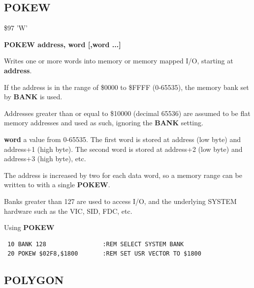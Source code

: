 \subsection{POKEW}
\begin{description}[leftmargin=2cm,style=nextline]
\item [Token:] \$97 'W'
\item [Format:] {\bf POKEW address, word [,word ...] }
\item [Usage:]  Writes one or more words into memory
                or memory mapped I/O, starting at
                {\bf address}.

                If the address is in the range of \$0000 to \$FFFF (0-65535), the
                memory bank set by {\bf BANK} is used.

                Addresses greater than or equal to \$10000 (decimal 65536) are assumed to be flat memory
                addresses and used as such, ignoring the {\bf BANK} setting.

                {\bf word} a value from 0-65535.
                The first word is stored at address (low byte)
                and address+1 (high byte). The second word is stored at
                address+2 (low byte) and address+3 (high byte), etc.

\item [Remarks:] The address is increased by two for each data word,
                 so a memory range can be written to with a single {\bf POKEW}.

                Banks greater than 127 are used to access I/O, and the underlying SYSTEM hardware such as the
                VIC, SID, FDC, etc.
\item [Example:] Using {\bf POKEW}

\begin{tcolorbox}[colback=black,coltext=white]
\verbatimfont{\codefont}
\begin{verbatim}
 10 BANK 128                :REM SELECT SYSTEM BANK
 20 POKEW $02F8,$1800       :REM SET USR VECTOR TO $1800
\end{verbatim}
\end{tcolorbox}
\end{description}


\newpage
\subsection{POLYGON}

